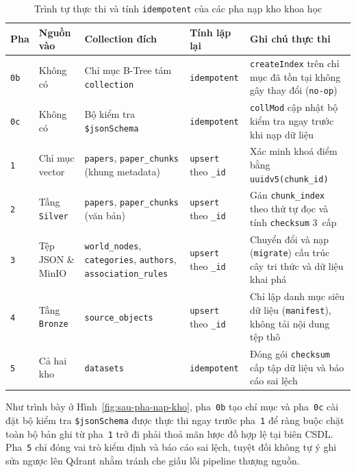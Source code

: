 \begin{table}[htbp]
\centering
\caption{Trình tự thực thi và tính \texttt{idempotent} của các pha nạp kho khoa học}
\label{tab:sau-pha-nap-kho-ch5}
\footnotesize
\setlength{\tabcolsep}{4pt}
\begin{tabularx}{\textwidth}{
  >{\raggedright\arraybackslash}p{0.9cm}
  >{\raggedright\arraybackslash}p{2.7cm}
  >{\raggedright\arraybackslash}p{4.3cm}
  >{\raggedright\arraybackslash}p{2.1cm}
  >{\raggedright\arraybackslash}X
}
\toprule
\textbf{Pha} & \textbf{Nguồn vào} & \textbf{Collection đích} & \textbf{Tính lặp lại} & \textbf{Ghi chú thực thi} \\
\midrule
\texttt{0b} & Không có & Chỉ mục B-Tree tám \texttt{collection} & \texttt{idempotent} & \texttt{createIndex} trên chỉ mục đã tồn tại không gây thay đổi (\texttt{no-op}) \\
\midrule
\texttt{0c} & Không có & Bộ kiểm tra \texttt{\$jsonSchema} & \texttt{idempotent} & \texttt{collMod} cập nhật bộ kiểm tra ngay trước khi nạp dữ liệu \\
\midrule
\texttt{1} & Chỉ mục vector & \texttt{papers}, \texttt{paper\_chunks} (khung metadata) & \texttt{upsert} theo \texttt{\_id} & Xác minh khoá điểm bằng \texttt{uuidv5(chunk\_id)} \\
\midrule
\texttt{2} & Tầng \texttt{Silver} & \texttt{papers}, \texttt{paper\_chunks} (văn bản) & \texttt{upsert} theo \texttt{\_id} & Gán \texttt{chunk\_index} theo thứ tự đọc và tính \texttt{checksum} 3~cấp \\
\midrule
\texttt{3} & Tệp JSON \& MinIO & \texttt{world\_nodes}, \texttt{categories}, \texttt{authors}, \texttt{association\_rules} & \texttt{upsert} theo \texttt{\_id} & Chuyển đổi và nạp (\texttt{migrate}) cấu trúc cây tri thức và dữ liệu khai phá \\
\midrule
\texttt{4} & Tầng \texttt{Bronze} & \texttt{source\_objects} & \texttt{upsert} theo \texttt{\_id} & Chỉ lập danh mục siêu dữ liệu (\texttt{manifest}), không tải nội dung tệp thô \\
\midrule
\texttt{5} & Cả hai kho & \texttt{datasets} & \texttt{idempotent} & Đóng gói \texttt{checksum} cấp tập dữ liệu và báo cáo sai lệch \\
\bottomrule
\end{tabularx}
\end{table}

Như trình bày ở Hình~\ref{fig:sau-pha-nap-kho}, pha~\texttt{0b} tạo chỉ mục và pha~\texttt{0c} cài đặt bộ kiểm tra \texttt{\$jsonSchema} được thực thi ngay trước pha~\texttt{1} để ràng buộc chặt toàn bộ bản ghi từ pha~\texttt{1} trở đi phải thoả mãn lược đồ hợp lệ tại biên CSDL. Pha~\texttt{5} chỉ đóng vai trò kiểm định và báo cáo sai lệch, tuyệt đối không tự ý ghi sửa ngược lên Qdrant nhằm tránh che giấu lỗi pipeline thượng nguồn.

